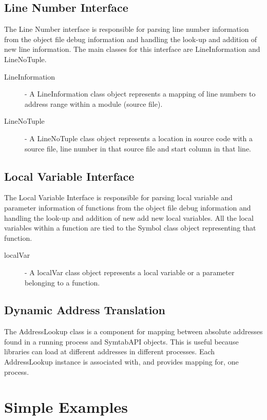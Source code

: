 \subsection{Line Number Interface}

The Line Number interface is responsible for parsing line number information from the object file debug information and handling the look-up and addition of new line information. The main classes for this interface are LineInformation and LineNoTuple. 

\begin{description}
\item[LineInformation] - A LineInformation class object represents a mapping of line numbers to address range within a module (source file). 
\item[LineNoTuple] - A LineNoTuple class object represents a location in source code with a source file, line number in that source file and start column in that line.
\end{description}

\subsection{Local Variable Interface}
The Local Variable Interface is responsible for parsing local variable and parameter information of functions from the object file debug information and handling the look-up and addition of new add new local variables. All the local variables within a function are tied to the Symbol class object representing that function.
\begin{description}
\item[localVar] - A localVar class object represents a local variable or a parameter belonging to a function.
\end{description}

\subsection{Dynamic Address Translation}
The AddressLookup class is a component for mapping between absolute addresses found in a running process and SymtabAPI objects. This is useful because libraries can load at different addresses in different processes. Each AddressLookup instance is associated with, and provides mapping for, one process.

\section{Simple Examples}

